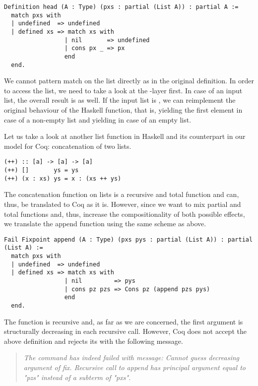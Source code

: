 \begin{verbatim}
Definition head (A : Type) (pxs : partial (List A)) : partial A :=
  match pxs with
  | undefined  => undefined
  | defined xs => match xs with
                 | nil       => undefined
                 | cons px _ => px
                 end
  end.
\end{verbatim}

We cannot pattern match on the list directly as in the original definition.
In order to access the list, we need to take a look at the -layer first.
In case of an  input list, the overall result is  as well.
If the input list is , we can reimplement the original behaviour of the Haskell function, that is, yielding the first element in case of a non-empty list and yielding  in case of an empty list.

Let us take a look at another list function in Haskell and its counterpart in our model for Coq: concatenation of two lists.

\begin{verbatim}
(++) :: [a] -> [a] -> [a]
(++) []       ys = ys
(++) (x : xs) ys = x : (xs ++ ys)
\end{verbatim}

The concatenation function on lists is a recursive and total function and can, thus, be translated to Coq as it is.
However, since we want to mix partial and total functions and, thus, increase the compositionality of both possible effects, we translate the append function using the same scheme as above.

\begin{verbatim}
Fail Fixpoint append (A : Type) (pxs pys : partial (List A)) : partial (List A) :=
  match pxs with
  | undefined  => undefined
  | defined xs => match xs with
                 | nil         => pys
                 | cons pz pzs => Cons pz (append pzs pys)
                 end
  end.
\end{verbatim}

The function  is recursive and, as far as we are concerned, the first argument is structurally decreasing in each
recursive call.
However, Coq does not accept the above definition and rejects its with the following message.

\begin{quote}
\emph{The command has indeed failed with message: Cannot guess decreasing
argument of fix.
Recursive call to append has principal argument equal to "pzs" instead of a subterm of "pxs".}
\end{quote}

